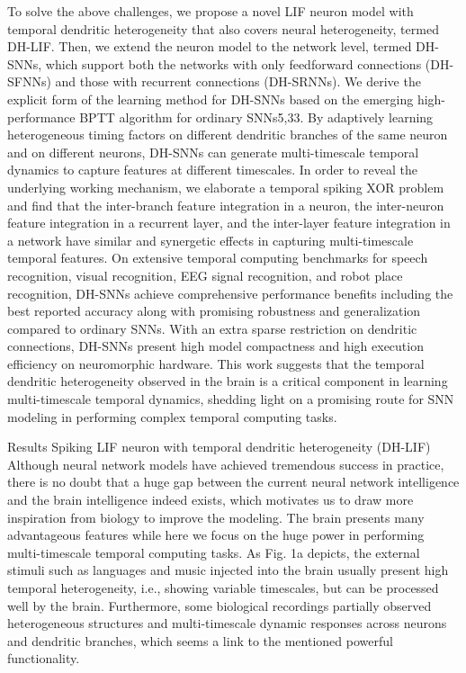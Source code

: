 To solve the above challenges, we propose a novel LIF neuron model with temporal dendritic heterogeneity that also covers neural heterogeneity, termed DH-LIF. Then, we extend the neuron model to the network level, termed DH-SNNs, which support both the networks with only feedforward connections (DH-SFNNs) and those with recurrent connections (DH-SRNNs). We derive the explicit form of the learning method for DH-SNNs based on the emerging high-performance BPTT algorithm for ordinary SNNs5,33. By adaptively learning heterogeneous timing factors on different dendritic branches of the same neuron and on different neurons, DH-SNNs can generate multi-timescale temporal dynamics to capture features at different timescales. In order to reveal the underlying working mechanism, we elaborate a temporal spiking XOR problem and find that the inter-branch feature integration in a neuron, the inter-neuron feature integration in a recurrent layer, and the inter-layer feature integration in a network have similar and synergetic effects in capturing multi-timescale temporal features. On extensive temporal computing benchmarks for speech recognition, visual recognition, EEG signal recognition, and robot place recognition, DH-SNNs achieve comprehensive performance benefits including the best reported accuracy along with promising robustness and generalization compared to ordinary SNNs. With an extra sparse restriction on dendritic connections, DH-SNNs present high model compactness and high execution efficiency on neuromorphic hardware. This work suggests that the temporal dendritic heterogeneity observed in the brain is a critical component in learning multi-timescale temporal dynamics, shedding light on a promising route for SNN modeling in performing complex temporal computing tasks.

Results
Spiking LIF neuron with temporal dendritic heterogeneity (DH-LIF)
Although neural network models have achieved tremendous success in practice, there is no doubt that a huge gap between the current neural network intelligence and the brain intelligence indeed exists, which motivates us to draw more inspiration from biology to improve the modeling. The brain presents many advantageous features while here we focus on the huge power in performing multi-timescale temporal computing tasks. As Fig. 1a depicts, the external stimuli such as languages and music injected into the brain usually present high temporal heterogeneity, i.e., showing variable timescales, but can be processed well by the brain. Furthermore, some biological recordings partially observed heterogeneous structures and multi-timescale dynamic responses across neurons and dendritic branches, which seems a link to the mentioned powerful functionality.

